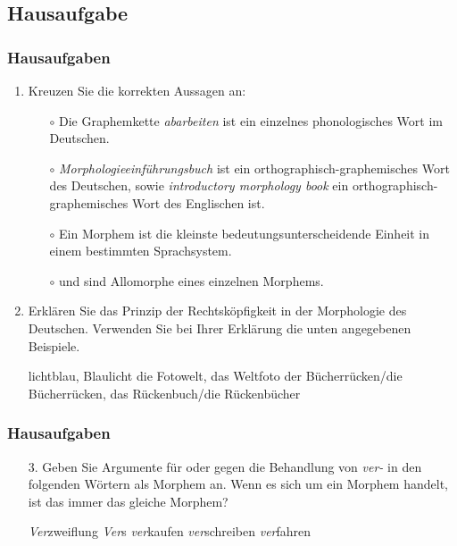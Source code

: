 \subsection{Hausaufgabe}

\begin{frame}
\frametitle{Hausaufgaben}


\begin{enumerate}
	\item Kreuzen Sie die korrekten Aussagen an: %
	
	\begin{itemize}
		\item[$\circ$] Die Graphemkette \emph{abarbeiten} ist ein einzelnes phonologisches Wort im Deutschen.
		\item[$\circ$] \emph{Morphologieeinführungsbuch} ist ein orthographisch-graphemisches Wort des Deutschen, sowie \emph{introductory morphology book} ein orthographisch-graphemisches Wort des Englischen ist.
		\item[$\circ$] Ein Morphem ist die kleinste bedeutungsunterscheidende Einheit in einem bestimmten Sprachsystem.
		\item[$\circ$]  und  sind Allomorphe eines einzelnen Morphems.
	\end{itemize}
	
	\item Erklären Sie das Prinzip der Rechtsköpfigkeit in der Morphologie des Deutschen. Verwenden Sie bei Ihrer Erklärung die unten angegebenen Beispiele.%
	
	\eal
	\ex lichtblau, Blaulicht
	\ex die Fotowelt, das Weltfoto
	\ex der Bücherrücken/die Bücherrücken, das Rückenbuch/die Rückenbücher
	\zl
\end{enumerate}

\end{frame}


\begin{frame}
\frametitle{Hausaufgaben}

\begin{itemize}
\item[3.] Geben Sie Argumente für oder gegen die Behandlung von \emph{ver-} in den folgenden Wörtern als Morphem an. Wenn es sich um ein Morphem handelt, ist das immer das gleiche Morphem? %

\eal
\ex \emph{Ver}zweiflung
\ex \emph{Ver}s
\ex \emph{ver}kaufen
\ex \emph{ver}schreiben
\ex \emph{ver}fahren
\zl

\end{itemize}
\end{frame}


